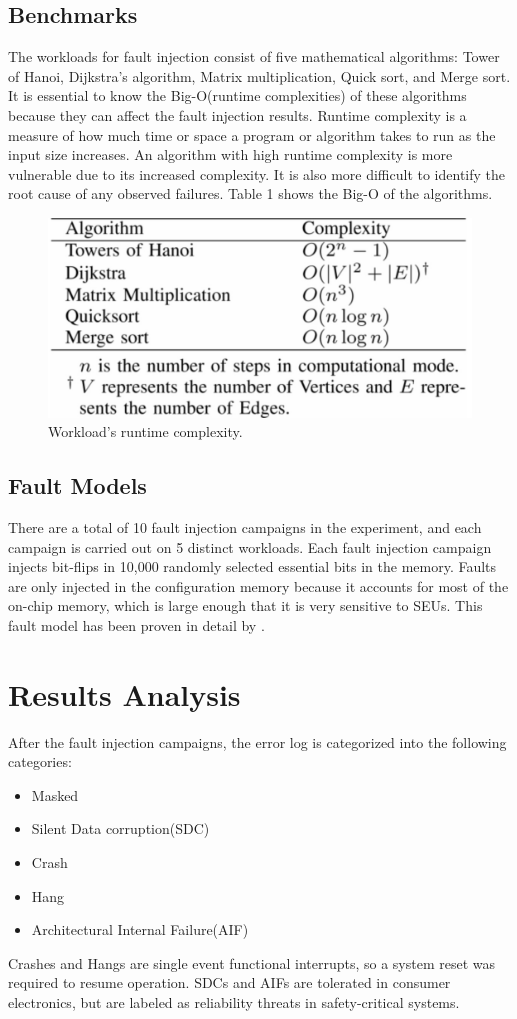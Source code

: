 \documentclass[conference]{IEEEtran}
\begin{document}
\subsection{Benchmarks}
The workloads for fault injection consist of five mathematical algorithms: Tower of Hanoi, Dijkstra's algorithm, Matrix multiplication, 
Quick sort, and Merge sort. It is essential to know the Big-O(runtime complexities) of these algorithms because they can affect the fault 
injection results. Runtime complexity is a measure of how much time or space a program or algorithm takes to run as the input size increases. 
An algorithm with high runtime complexity is more vulnerable due to its increased complexity. It is also more difficult to identify the 
root cause of any observed failures. Table 1 shows the Big-O of the algorithms. 
\begin{figure}[ht]
    \centering
    \includegraphics[scale = 0.17]{runtime.jpg}
    \caption{Workload's runtime complexity.}
\end{figure}
\subsection{Fault Models}
There are a total of 10 fault injection campaigns in the experiment, and each campaign is carried out on 5 distinct workloads. Each fault injection 
campaign injects bit-flips in 10,000 randomly selected essential bits in the memory. Faults are only injected in the configuration memory because
it accounts for most of the on-chip memory, which is large enough that it is very sensitive to SEUs. This fault model has been proven in detail
by \cite{b5}. 

\section{Results Analysis}
After the fault injection campaigns, the error log is categorized into the following categories:
\begin{itemize}
    \item Masked
    \item Silent Data corruption(SDC)
    \item Crash
    \item Hang
    \item Architectural Internal Failure(AIF)
\end{itemize}
Crashes and Hangs are single event functional interrupts, so a system reset was required to resume operation. SDCs and AIFs are tolerated in 
consumer electronics, but are labeled as reliability threats in safety-critical systems. 
\end{document}
